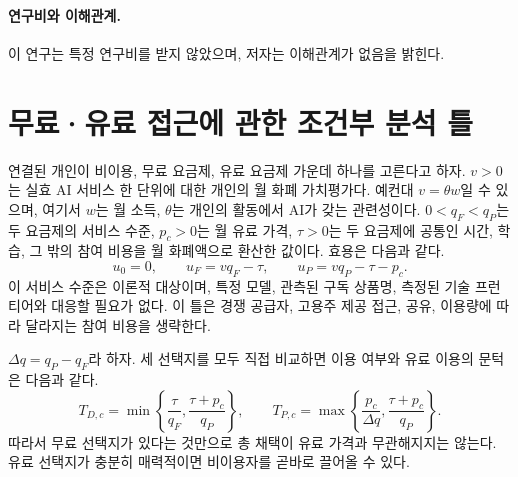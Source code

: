 \documentclass[11pt]{article}
\theoremstyle{definition}
\theoremstyle{remark}
\begin{document}
\paragraph{연구비와 이해관계.} 이 연구는 특정 연구비를 받지 않았으며, 저자는 이해관계가 없음을 밝힌다.




\appendix
\section{무료·유료 접근에 관한 조건부 분석 틀}\label{app:tiermodel}
\label{sec:conditional_access}

연결된 개인이 비이용, 무료 요금제, 유료 요금제 가운데 하나를 고른다고 하자. $v>0$는 실효 AI 서비스 한 단위에 대한 개인의 월 화폐 가치평가다. 예컨대 $v=\theta w$일 수 있으며, 여기서 $w$는 월 소득, $\theta$는 개인의 활동에서 AI가 갖는 관련성이다. $0<q_F<q_P$는 두 요금제의 서비스 수준, $p_c>0$는 월 유료 가격, $\tau>0$는 두 요금제에 공통인 시간, 학습, 그 밖의 참여 비용을 월 화폐액으로 환산한 값이다. 효용은 다음과 같다.
\begin{equation}
 u_0=0,\qquad u_F=vq_F-\tau,\qquad u_P=vq_P-\tau-p_c.
 \label{eq:tier_utilities}
\end{equation}
이 서비스 수준은 이론적 대상이며, 특정 모델, 관측된 구독 상품명, 측정된 기술 프런티어와 대응할 필요가 없다. 이 틀은 경쟁 공급자, 고용주 제공 접근, 공유, 이용량에 따라 달라지는 참여 비용을 생략한다.

$\Delta q=q_P-q_F$라 하자. 세 선택지를 모두 직접 비교하면 이용 여부와 유료 이용의 문턱은 다음과 같다.
\begin{equation}
 T_{D,c}=\min\left\{\frac{\tau}{q_F},\frac{\tau+p_c}{q_P}\right\},
 \qquad
 T_{P,c}=\max\left\{\frac{p_c}{\Delta q},\frac{\tau+p_c}{q_P}\right\}.
 \label{eq:general_thresholds}
\end{equation}
따라서 무료 선택지가 있다는 것만으로 총 채택이 유료 가격과 무관해지지는 않는다. 유료 선택지가 충분히 매력적이면 비이용자를 곧바로 끌어올 수 있다.
\end{document}
